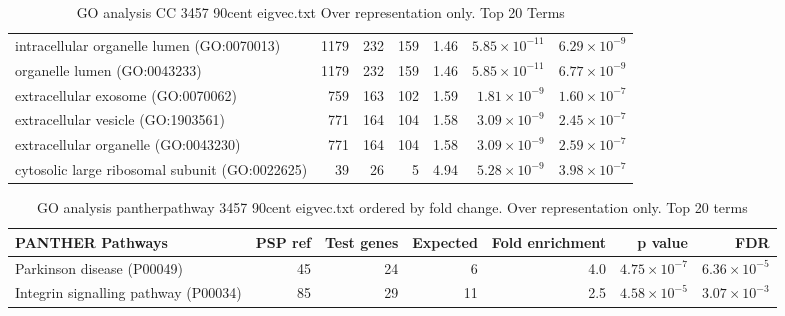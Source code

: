 \begin{table}[ht]
\begin{adjustbox}{width=\textwidth}
\begin{tabular}{lrrrlrr}
  intracellular organelle lumen (GO:0070013) & 1179 & 232 & 159 & 1.46 & $5.85 \times 10^{-11}$ & $6.29 \times 10^{-9}$ \\ 
  organelle lumen (GO:0043233) & 1179 & 232 & 159 & 1.46 & $5.85 \times 10^{-11}$ & $6.77 \times 10^{-9}$ \\ 
  extracellular exosome (GO:0070062) & 759 & 163 & 102 & 1.59 & $1.81 \times 10^{-9}$ & $1.60 \times 10^{-7}$ \\ 
  extracellular vesicle (GO:1903561) & 771 & 164 & 104 & 1.58 & $3.09 \times 10^{-9}$ & $2.45 \times 10^{-7}$ \\ 
  extracellular organelle (GO:0043230) & 771 & 164 & 104 & 1.58 & $3.09 \times 10^{-9}$ & $2.59 \times 10^{-7}$ \\ 
  cytosolic large ribosomal subunit (GO:0022625) & 39 & 26 & 5 & 4.94 & $5.28 \times 10^{-9}$ & $3.98 \times 10^{-7}$ \\ 
   \hline
\end{tabular}
\end{adjustbox}
\caption{GO analysis CC 3457 90cent eigvec.txt Over representation only. Top 20 Terms} 
\label{tab:GO analysis CC 3457 90cent eigvec.txt Over representation only. Top 20 Terms}
\end{table}

\begin{table}[ht]
\centering
\begin{adjustbox}{width=\textwidth}

\begin{tabular}{lrrrrrr}
  \hline
PANTHER Pathways & PSP ref & Test genes & Expected & Fold enrichment & p value & FDR \\ 
  \hline
Parkinson disease (P00049) & 45 & 24 & 6 & 4.0 & $4.75 \times 10^{-7}$ & $6.36 \times 10^{-5}$ \\ 
  Integrin signalling pathway (P00034) & 85 & 29 & 11 & 2.5 & $4.58 \times 10^{-5}$ & $3.07 \times 10^{-3}$ \\ 
   \hline
\end{tabular}
\end{adjustbox}
\caption{GO analysis pantherpathway 3457 90cent eigvec.txt ordered by fold change. Over representation only. Top 20 terms} 
\label{tab:GO analysis pantherpathway 3457 90cent eigvec.txt ordered by fold change. Over representation only. Top 20 terms}
\end{table}

